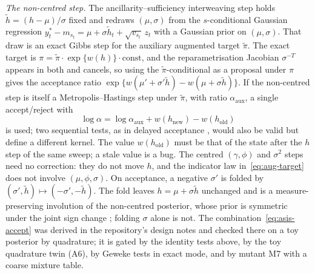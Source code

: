 \emph{The non-centred step.}
The ancillarity--sufficiency interweaving step \citep{yu2011center,kastner2014ancillarity} holds
$\tilde h = (h - \mu)/\sigma$ fixed and redraws $(\mu, \sigma)$ from the $s$-conditional Gaussian
regression $y^*_t - m_{s_t} = \mu + \sigma\tilde h_t + \sqrt{v_{s_t}}\,z_t$ with a Gaussian prior
on $(\mu, \sigma)$.
That draw is an exact Gibbs step for the auxiliary augmented target $\tilde\pi$.
The exact target is $\pi = \tilde\pi \cdot \exp\{w(h)\}\cdot\mathrm{const}$, and the
reparametrisation Jacobian $\sigma^{-T}$ appears in both and cancels, so using the
$\tilde\pi$-conditional as a proposal under $\pi$ gives the acceptance ratio
$\exp\{w(\mu' + \sigma'\tilde h) - w(\mu + \sigma\tilde h)\}$.
If the non-centred step is itself a Metropolis--Hastings step under $\tilde\pi$, with ratio
$\alpha_{\mathrm{aux}}$, a single accept/reject with
\begin{equation}\label{eq:asis-accept}
\log\alpha = \log\alpha_{\mathrm{aux}} + w(h_{\mathrm{new}}) - w(h_{\mathrm{old}})
\end{equation}
is used; two sequential tests, as in delayed acceptance \citep{christen2005markov}, would also be
valid but define a different kernel.
The value $w(h_{\mathrm{old}})$ must be that of the state after the $h$ step of the same sweep; a
stale value is a bug.
The centred $(\gamma, \phi)$ and $\sigma^2$ steps need no correction: they do not move $h$, and the
indicator law in~\eqref{eq:aug-target} does not involve $(\mu, \phi, \sigma)$.
On acceptance, a negative $\sigma'$ is folded by $(\sigma', \tilde h) \mapsto (-\sigma', -\tilde h)$.
The fold leaves $h = \mu + \sigma\tilde h$ unchanged and is a measure-preserving involution of the
non-centred posterior, whose prior is symmetric under the joint sign change
\citep{fruhwirth2010stochastic}; folding $\sigma$ alone is not.
The combination~\eqref{eq:asis-accept} was derived in the repository's design notes and checked
there on a toy posterior by quadrature; it is gated by the identity tests above, by the toy
quadrature twin (A6), by Geweke tests in exact mode, and by mutant M7 with a coarse mixture table.
